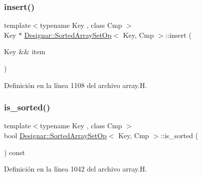 \subsubsection{\texorpdfstring{insert()}{insert()}\hspace{0.1cm}{\footnotesize\ttfamily [2/2]}}
{\footnotesize\ttfamily template$<$typename Key , class Cmp $>$ \\
Key $\ast$ \hyperlink{class_designar_1_1_sorted_array_set_op}{Designar\+::\+Sorted\+Array\+Set\+Op}$<$ Key, Cmp $>$\+::insert (\begin{DoxyParamCaption}\item[{Key \&\&}]{item }\end{DoxyParamCaption})}



Definición en la línea 1108 del archivo array.\+H.

\mbox{\label{class_designar_1_1_sorted_array_set_op_aa11c07509319e513a6f8dd0f3ab7663a}} 
\subsubsection{\texorpdfstring{is\+\_\+sorted()}{is\_sorted()}}
{\footnotesize\ttfamily template$<$typename Key , class Cmp $>$ \\
bool \hyperlink{class_designar_1_1_sorted_array_set_op}{Designar\+::\+Sorted\+Array\+Set\+Op}$<$ Key, Cmp $>$\+::is\+\_\+sorted (\begin{DoxyParamCaption}{ }\end{DoxyParamCaption}) const\hspace{0.3cm}{\ttfamily [inline]}}



Definición en la línea 1042 del archivo array.\+H.

\mbox{\label{class_designar_1_1_sorted_array_set_op_a27beb3e6b8f6b83c6efa46c38e8d22f9}} 
